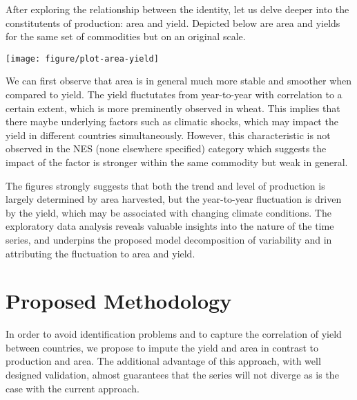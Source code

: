 \documentclass[nojss]{jss}\usepackage{graphicx, color}
\newenvironment{knitrout}{}{} %
\begin{document}
After exploring the relationship between the identity, let us delve
deeper into the constitutents of production: area and yield. Depicted
below are area and yields for the same set of commodities but on an
original scale.
















\begin{knitrout}
\color{fgcolor}

{\centering \texttt{[image: figure/plot-area-yield]} 

}



\end{knitrout}


We can first observe that area is in general much more stable and
smoother when compared to yield. The yield fluctutates from
year-to-year with correlation to a certain extent, which is more
preminently observed in wheat. This implies that there maybe
underlying factors such as climatic shocks, which may impact the yield
in different countries simultaneously. However, this characteristic is
not observed in the NES (none elsewhere specified) category which
suggests the impact of the factor is stronger within the same
commodity but weak in general.


The figures strongly suggests that both the trend and level of 
production is largely determined by  area harvested, but the
year-to-year fluctuation is driven by the yield, which may be
associated with changing climate conditions. The exploratory data analysis
reveals valuable insights into the nature of the time series, and
underpins the proposed model decomposition of variability and in
attributing the fluctuation to area and yield.





\section{Proposed Methodology}
In order to avoid identification problems and to capture the
correlation of yield between countries, we propose to impute the yield
and area in contrast to production and area. The additional advantage
of this approach, with well designed validation, almost guarantees
that the series will not diverge as is the case with the current
approach.
\end{document}
